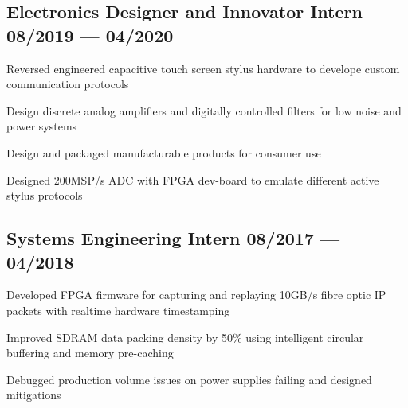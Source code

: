 \documentclass[letter,10pt]{article}
\begin{document}
\subsection{{Electronics Designer and Innovator Intern \hfill 08/2019 --- 04/2020}}
\begin{zitemize}
\item Reversed engineered capacitive touch screen stylus hardware to develope custom communication protocols
\item Design discrete analog amplifiers and digitally controlled filters for low noise and power systems
\item Design and packaged manufacturable products for consumer use
\item Designed 200MSP/s ADC with FPGA dev-board to emulate different active stylus protocols
\end{zitemize}
{\color{sectiondivide} \vspace{-0.75em}\hrulefill}

\subsection{{Systems Engineering Intern \hfill 08/2017 --- 04/2018}}
\begin{zitemize}
\item Developed FPGA firmware for capturing and replaying 10GB/s fibre optic IP packets with realtime hardware timestamping
\item Improved SDRAM data packing density by 50\% using intelligent circular buffering and memory pre-caching
\item Debugged production volume issues on power supplies failing and designed mitigations
\end{zitemize}
\end{document}
